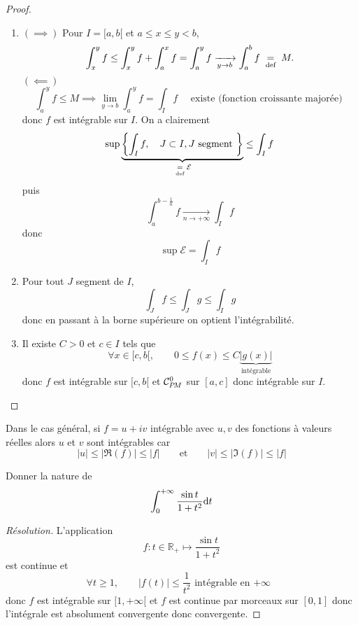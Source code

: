 \begin{proof}~
    \begin{enumerate}
        \item $(\implies)$ Pour $I=[a, b[$ et $a\leq x\leq y<b$, \[
                \int_x^yf\leq \int_x^yf+\int_a^xf=\int_a^yf\xrightarrow[y\to b]{}\int_a^bf\;\underset{\text{def}}=\; M.
            \]
            $(\impliedby)$ \[
                \int_a^yf\leq M\implies \lim_{y\to b}\int_a^yf=\int_If\quad \text{ existe (fonction croissante majorée) }
            \]
            donc $f$ est intégrable sur $I$. On a clairement \[
                \sup \underbrace{\left\{ \int_If,\quad J\subset I, J\text{ segment } \right\}}_{\;\underset{\text{def}}=\; \mathcal E}\leq \int_If
            \]
            puis \[
                \int_a^{b-\frac1n}f\xrightarrow[n\to+\infty]{}\int_If
            \]
            donc \[
                \sup \mathcal E=\int_If
            \]
        \item Pour tout $J$ segment de $I$, \[
                \int_Jf\leq \int_Jg\leq \int_I g
            \]
            donc en passant à la borne supérieure on optient l'intégrabilité.
        \item Il existe $C>0$ et $c\in I$ tels que \[
                \forall x\in [c, b[, \qquad 0\leq f(x)\leq C\underbrace{|g(x)|}_{\text{intégrable}}
            \]
            donc $f$ est intégrable sur $[c, b[$ et $\CPM$ sur $[a, c]$ donc intégrable sur $I$.
    \end{enumerate}
\end{proof}

\begin{rem}
    Dans le cas général, si $f=u+iv$ intégrable avec $u,v$ des fonctions à valeurs réelles alors $u$ et $v$ sont intégrables car \[
        |u|\leq |\Re (f)|\leq |f|\qquad\text{et}\qquad |v|\leq |\Im(f)|\leq |f|
    \]
\end{rem}

\begin{exo}
    Donner la nature de \[
        \int_0^{+\infty}\frac{\sin t}{1+t^2}\mathrm{d} t
    \]
\end{exo}

\begin{proof}[Résolution]
    L'application \[
            f:t\in\mathbb R_+\longmapsto \frac{\sin t}{1+t^2}
    \]
    est continue et \[
        \forall t\geq 1, \qquad |f(t)|\leq \frac1{t^2}\text{ intégrable en $+\infty$ }
    \]
    donc $f$ est intégrable sur $[1, +\infty[$ et $f$ est continue par morceaux sur $[0, 1]$ donc l'intégrale est absolument convergente donc convergente.
\end{proof}

